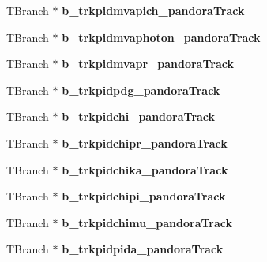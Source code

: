 \begin{DoxyCompactItemize}
\item 
\hypertarget{classanatree_abab57531ca161288dec06c6c678344de}{T\-Branch $\ast$ {\bfseries b\-\_\-trkpidmvapich\-\_\-pandora\-Track}}\label{classanatree_abab57531ca161288dec06c6c678344de}

\item 
\hypertarget{classanatree_a53bf5d9835d4fc61762f0049955d2621}{T\-Branch $\ast$ {\bfseries b\-\_\-trkpidmvaphoton\-\_\-pandora\-Track}}\label{classanatree_a53bf5d9835d4fc61762f0049955d2621}

\item 
\hypertarget{classanatree_a9a8d8fee5ba81cc3db424a0f899c05c9}{T\-Branch $\ast$ {\bfseries b\-\_\-trkpidmvapr\-\_\-pandora\-Track}}\label{classanatree_a9a8d8fee5ba81cc3db424a0f899c05c9}

\item 
\hypertarget{classanatree_a245620b28a0541c6a096ab2783d26ba6}{T\-Branch $\ast$ {\bfseries b\-\_\-trkpidpdg\-\_\-pandora\-Track}}\label{classanatree_a245620b28a0541c6a096ab2783d26ba6}

\item 
\hypertarget{classanatree_af7835b48b7035a4388baac75dddcda40}{T\-Branch $\ast$ {\bfseries b\-\_\-trkpidchi\-\_\-pandora\-Track}}\label{classanatree_af7835b48b7035a4388baac75dddcda40}

\item 
\hypertarget{classanatree_a992ceb21d01762710cbceeeea8121e1a}{T\-Branch $\ast$ {\bfseries b\-\_\-trkpidchipr\-\_\-pandora\-Track}}\label{classanatree_a992ceb21d01762710cbceeeea8121e1a}

\item 
\hypertarget{classanatree_a3680e58f1171adfe074e3150c282b194}{T\-Branch $\ast$ {\bfseries b\-\_\-trkpidchika\-\_\-pandora\-Track}}\label{classanatree_a3680e58f1171adfe074e3150c282b194}

\item 
\hypertarget{classanatree_aa7e82ff617304684607f87b3e4af3f73}{T\-Branch $\ast$ {\bfseries b\-\_\-trkpidchipi\-\_\-pandora\-Track}}\label{classanatree_aa7e82ff617304684607f87b3e4af3f73}

\item 
\hypertarget{classanatree_ad6ce539e70ae297ffe986e93a0ff8450}{T\-Branch $\ast$ {\bfseries b\-\_\-trkpidchimu\-\_\-pandora\-Track}}\label{classanatree_ad6ce539e70ae297ffe986e93a0ff8450}

\item 
\hypertarget{classanatree_a4f90841d6ff60ac22137e2bf9abe6b6b}{T\-Branch $\ast$ {\bfseries b\-\_\-trkpidpida\-\_\-pandora\-Track}}\label{classanatree_a4f90841d6ff60ac22137e2bf9abe6b6b}


\end{DoxyCompactItemize}
